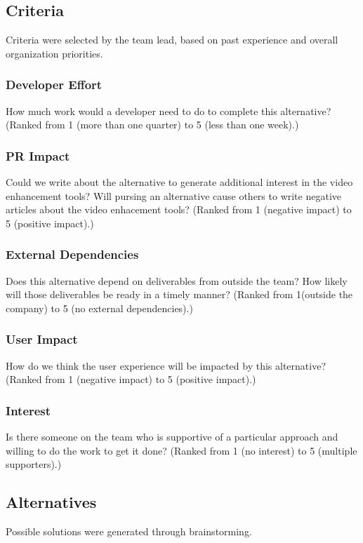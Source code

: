 \documentclass[se,resubmit]{uw-wkrpt}
\begin{document}
\subsection {Criteria}
Criteria were selected by the team lead, based on past experience and
overall organization priorities.

\subsubsection{Developer Effort}
How much work would a developer need to do to complete this alternative?
(Ranked from 1 (more than one quarter) to 5 (less than one week).)

\subsubsection{PR Impact}
Could we write about the alternative to generate additional interest in the
video enhancement tools? Will pursing an alternative cause others to write
negative articles about the video enhacement tools? (Ranked from 1
(negative impact) to 5 (positive impact).)

\subsubsection{External Dependencies}
Does this alternative depend on deliverables from outside the team? How
likely will those deliverables be ready in a timely manner? (Ranked from
1(outside the company) to 5 (no external dependencies).)

\subsubsection{User Impact}
How do we think the user experience will be impacted by this alternative?
(Ranked from 1 (negative impact) to 5 (positive impact).)

\subsubsection{Interest}
Is there someone on the team who is supportive of a particular approach and
willing to do the work to get it done?
(Ranked from 1 (no interest) to 5 (multiple supporters).)

\subsection{Alternatives}
Possible solutions were generated through brainstorming.
\end{document}
